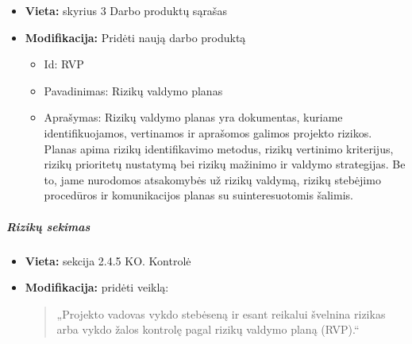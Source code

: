 \documentclass{article}
\begin{document}
\vspace{10pt}
\begin{itemize}
    \item \textbf{Vieta:} skyrius 3 Darbo produktų sąrašas
    \item \textbf{Modifikacija:} Pridėti naują darbo produktą
    \begin{itemize}
        \item Id: RVP
        \item Pavadinimas: Rizikų valdymo planas
        \item Aprašymas: Rizikų valdymo planas yra dokumentas, kuriame identifikuojamos, vertinamos ir aprašomos galimos projekto rizikos. Planas apima rizikų identifikavimo metodus, rizikų vertinimo kriterijus, rizikų prioritetų nustatymą bei rizikų mažinimo ir valdymo strategijas. Be to, jame nurodomos atsakomybės už rizikų valdymą, rizikų stebėjimo procedūros ir komunikacijos planas su suinteresuotomis šalimis.
    \end{itemize}
\end{itemize}

\subparagraph{Rizikų sekimas}
\begin{itemize}
    \item \textbf{Vieta:} sekcija 2.4.5 KO. Kontrolė
    \item \textbf{Modifikacija:} pridėti veiklą:
    \begin{quote}
        „Projekto vadovas vykdo stebėseną ir esant reikalui švelnina rizikas arba vykdo žalos kontrolę pagal rizikų valdymo planą (RVP).“
    \end{quote}
\end{itemize}
\end{document}
